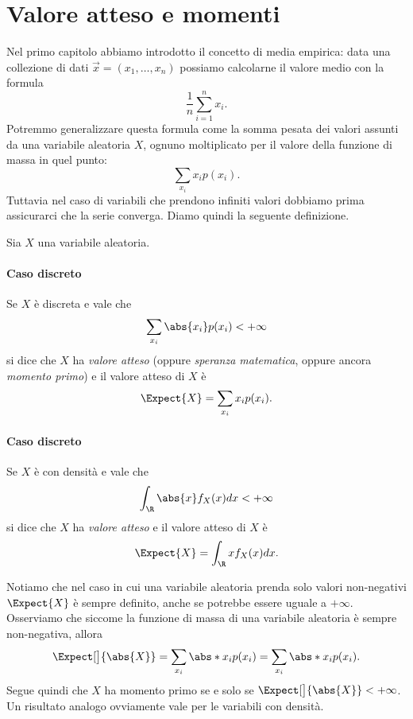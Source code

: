 \section{Valore atteso e momenti}

Nel primo capitolo abbiamo introdotto il concetto di media empirica: data una collezione di dati $\vec x = (x_1, \dots, x_n)$ possiamo calcolarne il valore medio con la formula \[
    \frac1n \sum_{i = 1}^n x_i. 
\] Potremmo generalizzare questa formula come la somma pesata dei valori assunti da una variabile aleatoria $X$, ognuno moltiplicato per il valore della funzione di massa in quel punto: \[
    \sum_{x_i} x_i p(x_i). 
\] Tuttavia nel caso di variabili che prendono infiniti valori dobbiamo prima assicurarci che la serie converga. Diamo quindi la seguente definizione.

\begin{definition}
     Sia $X$ una variabile aleatoria.
    \paragraph{Caso discreto} Se $X$ è discreta e vale che \[
        \sum_{x_i} \abs{x_i}p(x_i) < +\infty
    \] si dice che $X$ ha \emph{valore atteso} (oppure \emph{speranza matematica}, oppure ancora \emph{momento primo}) e il valore atteso di $X$ è \[
        \Expect{X} = \sum_{x_i} x_ip(x_i).    
    \]
    \paragraph{Caso discreto} Se $X$ è con densità e vale che \[
        \int_{\R} \abs{x}f_X(x)dx < +\infty
    \] si dice che $X$ ha \emph{valore atteso} e il valore atteso di $X$ è \[
        \Expect{X} = \int_{\R} xf_X(x)dx.    
    \]
\end{definition}



\begin{remark}
    Notiamo che nel caso in cui una variabile aleatoria prenda solo valori non-negativi $\Expect{X}$ è sempre definito, anche se potrebbe essere uguale a $+\infty$.
    Osserviamo che siccome la funzione di massa di una variabile aleatoria è sempre non-negativa, allora \[
        \Expect[\big]{\abs{X}} = \sum_{x_i} \abs*{x_ip(x_i)} = \sum_{x_i} \abs*{x_i}p(x_i).   
    \] Segue quindi che $X$ ha momento primo se e solo se $\Expect[\big]{\abs{X}} < +\infty$. Un risultato analogo ovviamente vale per le variabili con densità.
\end{remark}